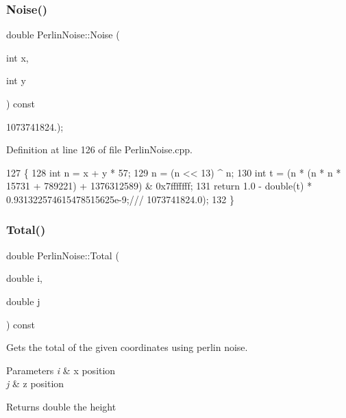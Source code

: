 \subsubsection{\texorpdfstring{Noise()}{Noise()}}
{\footnotesize\ttfamily double Perlin\+Noise\+::\+Noise (\begin{DoxyParamCaption}\item[{int}]{x,  }\item[{int}]{y }\end{DoxyParamCaption}) const\hspace{0.3cm}{\ttfamily [private]}}

1073741824.); 

Definition at line 126 of file Perlin\+Noise.\+cpp.


\begin{DoxyCode}
127 \{
128     \textcolor{keywordtype}{int} n = x + y * 57;
129     n = (n << 13) ^ n;
130     \textcolor{keywordtype}{int} t = (n * (n * n * 15731 + 789221) + 1376312589) & 0x7fffffff;
131     \textcolor{keywordflow}{return} 1.0 - double(t) * 0.931322574615478515625e-9;\textcolor{comment}{/// 1073741824.0);}
132 \textcolor{comment}{}\}
\end{DoxyCode}
\mbox{\label{class_perlin_noise_a63d0a127952107e5628c428c8a234de8}} 
\subsubsection{\texorpdfstring{Total()}{Total()}}
{\footnotesize\ttfamily double Perlin\+Noise\+::\+Total (\begin{DoxyParamCaption}\item[{double}]{i,  }\item[{double}]{j }\end{DoxyParamCaption}) const\hspace{0.3cm}{\ttfamily [private]}}



Gets the total of the given coordinates using perlin noise. 


\begin{DoxyParams}{Parameters}
{\em i} & x position \\
\hline
{\em j} & z position \\
\hline
\end{DoxyParams}
\begin{DoxyReturn}{Returns}
double the height 
\end{DoxyReturn}


